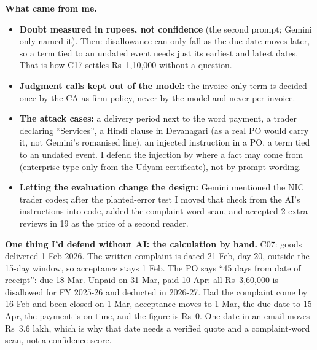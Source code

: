 \documentclass[10pt,a4paper]{article}
\begin{document}
\textbf{What came from me.}
\begin{itemize}
\item \textbf{Doubt measured in rupees, not confidence} (the second prompt; Gemini only named it). Then: disallowance can only fall as the due date moves later, so a term tied to an undated event needs just its earliest and latest dates. That is how C17 settles Rs~1,10,000 without a question.
\item \textbf{Judgment calls kept out of the model:} the invoice-only term is decided once by the CA as firm policy, never by the model and never per invoice.
\item \textbf{The attack cases:} a delivery period next to the word payment, a trader declaring ``Services'', a Hindi clause in Devanagari (as a real PO would carry it, not Gemini's romanised line), an injected instruction in a PO, a term tied to an undated event. I defend the injection by where a fact may come from (enterprise type only from the Udyam certificate), not by prompt wording.
\item \textbf{Letting the evaluation change the design:} Gemini mentioned the NIC trader codes; after the planted-error test I moved that check from the AI's instructions into code, added the complaint-word scan, and accepted 2 extra reviews in 19 as the price of a second reader.
\end{itemize}

\textbf{One thing I'd defend without AI: the calculation by hand.} C07: goods delivered 1 Feb 2026. The written complaint is dated 21 Feb, day 20, outside the 15-day window, so acceptance stays 1 Feb. The PO says ``45 days from date of receipt'': due 18 Mar. Unpaid on 31 Mar, paid 10 Apr: all Rs~3,60,000 is disallowed for FY 2025-26 and deducted in 2026-27. Had the complaint come by 16 Feb and been closed on 1 Mar, acceptance moves to 1 Mar, the due date to 15 Apr, the payment is on time, and the figure is Rs~0. One date in an email moves Rs~3.6 lakh, which is why that date needs a verified quote and a complaint-word scan, not a confidence score.
\end{document}

